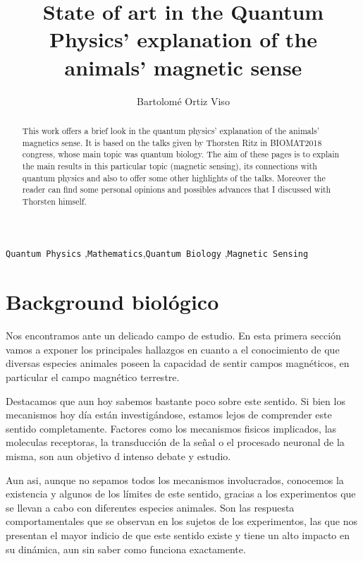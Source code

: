 \documentclass[1p]{elsarticle}
\begin{document}
\begin{frontmatter}

\title{State of art in the Quantum Physics' explanation of the animals' magnetic sense }

\author{Bartolomé Ortiz Viso}
\address{Master en Física y Matemáticas\\ Universidad de Granada\\23/06/2018}

\begin{abstract}
This work offers a brief look in the quantum physics' explanation of the animals' magnetics sense. It is based on the talks given by Thorsten Ritz in BIOMAT2018 congress, whose main topic was quantum biology. The aim of these pages is to explain the main results in this particular topic (magnetic sensing), its connections with quantum physics and also to offer some other highlights of the talks. Moreover the reader can find some personal opinions and possibles advances that I discussed with Thorsten himself. 
\end{abstract}

\begin{keyword}
 \texttt{Quantum Physics} \sep \texttt{Mathematics}\sep \texttt{Quantum Biology} \sep \texttt{Magnetic Sensing}
\end{keyword}

\end{frontmatter}
\setlength\parindent{0pt}
\linenumbers


\section{Background biológico}

Nos encontramos ante un delicado campo de estudio. En esta primera sección vamos a exponer los principales hallazgos en cuanto a el conocimiento de que diversas especies animales poseen la capacidad de sentir campos magnéticos, en particular el campo magnético terrestre.

Destacamos que aun hoy sabemos bastante poco sobre este sentido. Si bien los mecanismos hoy día están investigándose, estamos lejos de comprender este sentido completamente. Factores como los mecanismos fisicos implicados, las moleculas receptoras, la transducción de la señal o el procesado neuronal de la misma, son aun objetivo d intenso debate y estudio.

Aun asi, aunque no sepamos todos los mecanismos involucrados, conocemos la existencia y algunos de los límites de este sentido, gracias a los experimentos que se llevan a cabo con diferentes especies animales. Son las respuesta comportamentales que se observan en los sujetos de los experimentos, las que nos presentan el mayor indicio de que este sentido existe y tiene un alto impacto en su dinámica, aun sin saber como funciona exactamente.
\end{document}

